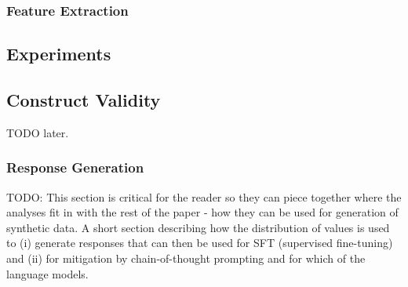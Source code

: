 \subsubsection{Feature Extraction}
\textcolor{black!30}{\lipsum[12-13]}

\subsection{Experiments}
\textcolor{black!30}{\lipsum[14-16]}

\subsection{Construct Validity}
TODO later.

\subsubsection{Response Generation}
\textcolor{black!40}{TODO: This section is critical for the reader so they can piece together where the analyses fit in with the rest of the paper - how they can be used for generation of synthetic data. A short section describing how the distribution of values is used to (i) generate responses that can then be used for SFT (supervised fine-tuning) and (ii) for mitigation by chain-of-thought prompting and for which of the language models.}




